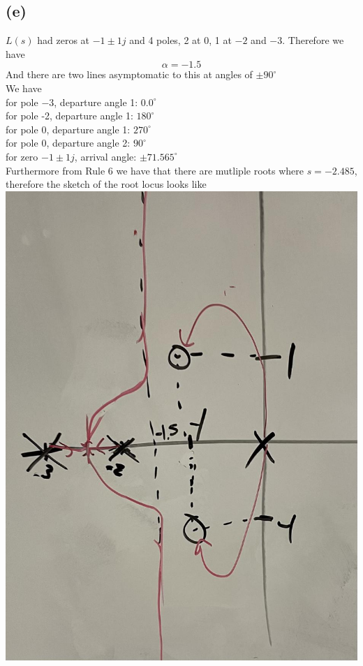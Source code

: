 \documentclass[12pt]{article}
\begin{document}
\subsection*{(e)}
$L(s)$ had zeros at $-1\pm1j$ and 4 poles, 2 at 0, 1 at $-2$ and $-3$. Therefore we have
$$\alpha=-1.5$$
And there are two lines asymptomatic to this at angles of $\pm90^{\circ}$
\\
We have
\\for pole $-3$, departure angle 1: $0.0^{\circ}$
\\for pole -2, departure angle 1: $180^{\circ}$
\\for pole 0, departure angle 1: $270^{\circ}$
\\for pole 0, departure angle 2: $90^{\circ}$
\\for zero $-1\pm1j$, arrival angle: $\pm71.565^{\circ}$\\
Furthermore from Rule 6 we have that there are mutliple roots where $s=-2.485$, therefore the sketch of the root locus looks like
\\
\includegraphics[scale=.15]{Problem2Sketch2.jpg}
\end{document}
